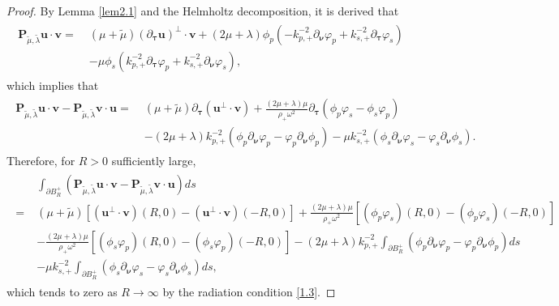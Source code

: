 \documentclass[final,reqno]{siamltex}
\newcommand{\om}{\omega}
\newcommand{\pa}{\partial}
\newcommand{\ben}{\begin{eqnarray*}}
\newcommand{\enn}{\end{eqnarray*}}
\begin{document}
\begin{proof}
	By Lemma \ref{lem2.1} and the Helmholtz decomposition, it is derived that 
	\begin{align}\label{2.1a} 
	  \begin{aligned} 
	  \mathbf{P}_{\tilde{\mu},\tilde{\lambda}}\mathbf{u}\cdot\mathbf{v}=\;&(\mu+\tilde{\mu})(\pa_{\boldsymbol{\tau}}\mathbf{u})^\perp\cdot\mathbf{v}+(2\mu+\lambda)\phi_p(-k_{p,+}^{-2}\pa_{\boldsymbol{\nu}}\varphi_p+k_{s,+}^{-2}\pa_{\boldsymbol{\tau}}\varphi_s) \\
	  &-\mu\phi_s(k_{p,+}^{-2}\pa_{\boldsymbol{\tau}}\varphi_p+k_{s,+}^{-2}\pa_{\boldsymbol{\nu}}\varphi_s), 
	  \end{aligned}
	\end{align}
	which implies that 
	\begin{align*}
	  \begin{aligned}
	  \mathbf{P}_{\tilde{\mu},\tilde{\lambda}}\mathbf{u}\cdot\mathbf{v}-\mathbf{P}_{\tilde{\mu},\tilde{\lambda}}\mathbf{v}\cdot\mathbf{u} 
	  =\;&(\mu+\tilde{\mu})\pa_{\boldsymbol{\tau}}(\mathbf{u}^\perp\cdot\mathbf{v})+\frac{(2\mu+\lambda)\mu}{\rho_+\om^2}\pa_{\boldsymbol{\tau}}(\phi_p\varphi_s-\phi_s\varphi_p) \\
	  &-(2\mu+\lambda)k_{p,+}^{-2}(\phi_p\pa_{\boldsymbol{\nu}}\varphi_p-\varphi_p\pa_{\boldsymbol{\nu}}\phi_p)-\mu k_{s,+}^{-2}(\phi_s\pa_{\boldsymbol{\nu}}\varphi_s-\varphi_s\pa_{\boldsymbol{\nu}}\phi_s). 
	  \end{aligned}
	\end{align*}
	Therefore, for $R>0$ sufficiently large, 
	\ben
	  \begin{aligned}
	  &\int_{\pa B_R^+}\left(\mathbf{P}_{\tilde{\mu},\tilde{\lambda}}\mathbf{u}\cdot\mathbf{v}-\mathbf{P}_{\tilde{\mu},\tilde{\lambda}}\mathbf{v}\cdot\mathbf{u}\right)ds \\
	  =\;&(\mu+\tilde{\mu})[(\mathbf{u}^\perp\cdot\mathbf{v})(R,0)-(\mathbf{u}^\perp\cdot\mathbf{v})(-R,0)]+\frac{(2\mu+\lambda)\mu}{\rho_+\om^2}[(\phi_p\varphi_s)(R,0)-(\phi_p\varphi_s)(-R,0)] \\
	  &-\frac{(2\mu+\lambda)\mu}{\rho_+\om^2}[(\phi_s\varphi_p)(R,0)-(\phi_s\varphi_p)(-R,0)]-(2\mu+\lambda)k_{p,+}^{-2}\int_{\pa B_R^+}(\phi_p\pa_{\boldsymbol{\nu}}\varphi_p-\varphi_p\pa_{\boldsymbol{\nu}}\phi_p)ds \\
	  &-\mu k_{s,+}^{-2}\int_{\pa B_R^+}(\phi_s\pa_{\boldsymbol{\nu}}\varphi_s-\varphi_s\pa_{\boldsymbol{\nu}}\phi_s)ds, 
	  \end{aligned}
	\enn
	which tends to zero as $R\rightarrow\infty$ by the radiation condition \eqref{1.3}. 
	

\end{proof}
\end{document}
